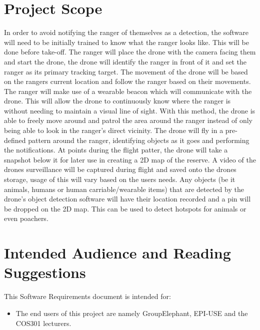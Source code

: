 \section{Project Scope}
\begin{flushleft}
	In order to avoid notifying the ranger of themselves as a detection, the software will need to be initially trained to know what the ranger looks like. 
	This will be done before take-off. The ranger will place the drone with the camera facing them and start the drone, 
	the drone will identify the ranger in front of it and set the ranger as its primary tracking target.
	\newline
	\newline
	The movement of the drone will be based on the rangers current location and follow the ranger based on their movements.
	The ranger will make use of a wearable beacon which will communicate with the drone. 
	This will allow the drone to continuously know where the ranger is without needing to maintain a visual line of sight. 
	With this method, the drone is able to freely move around and patrol the area around the ranger instead of only being 
	able to look in the ranger’s direct vicinity.
	\newline
	\newline
	The drone will fly in a pre-defined pattern around the ranger, identifying objects as it goes and performing the notifications.
	At points during the flight patter, the drone will take a snapshot below it for later use in creating a 2D map of the reserve.
	A video of the drones surveillance will be captured during flight and saved onto the drones storage, usage of this will vary based on the users needs.
	Any objects (be it animals, humans or human carriable/wearable items) that are detected by the drone’s object detection software 
	will have their location recorded and a pin will be dropped on the 2D map. This can be used to detect hotspots for animals or even poachers.
	\newline
	\newline
\end{flushleft}
\section{Intended Audience and Reading Suggestions}
This Software Requirements document is intended for:

\begin{itemize}
	\item The end users of this project are namely GroupElephant, EPI-USE and the COS301 lecturers.
\end{itemize}